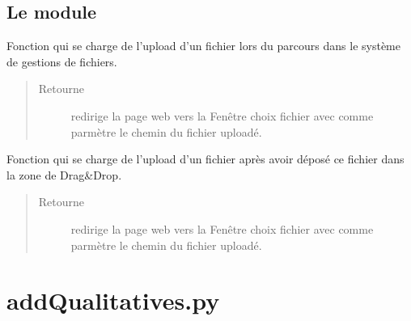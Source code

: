 \documentclass[letterpaper,10pt,french]{sphinxmanual}
\begin{document}
\section{Le module }
\label{\detokenize{choixFichier:le-module-fenetre-choix-fichier}}

\begin{fulllineitems}
\label{\detokenize{choixFichier:interface_web.choixFichier.FileWithSGF}}
Fonction qui se charge de l’upload d’un fichier lors du parcours dans le système de gestions de fichiers.
\begin{quote}\begin{description}
\item[{Retourne}] \leavevmode
redirige la page web vers la Fenêtre choix fichier avec comme parmètre le chemin du fichier uploadé.

\end{description}\end{quote}

\end{fulllineitems}


\begin{fulllineitems}
\label{\detokenize{choixFichier:interface_web.choixFichier.FileWithDragDrop}}
Fonction qui se charge de l’upload d’un fichier après avoir déposé ce fichier dans la zone de Drag\&Drop.
\begin{quote}\begin{description}
\item[{Retourne}] \leavevmode
redirige la page web vers la Fenêtre choix fichier avec comme parmètre le chemin du fichier uploadé.

\end{description}\end{quote}

\end{fulllineitems}



\chapter{addQualitatives.py}
\label{\detokenize{addQualitatives:module-add.addQualitatives}}\label{\detokenize{addQualitatives:addqualitatives-py}}\label{\detokenize{addQualitatives::doc}}
\end{document}
